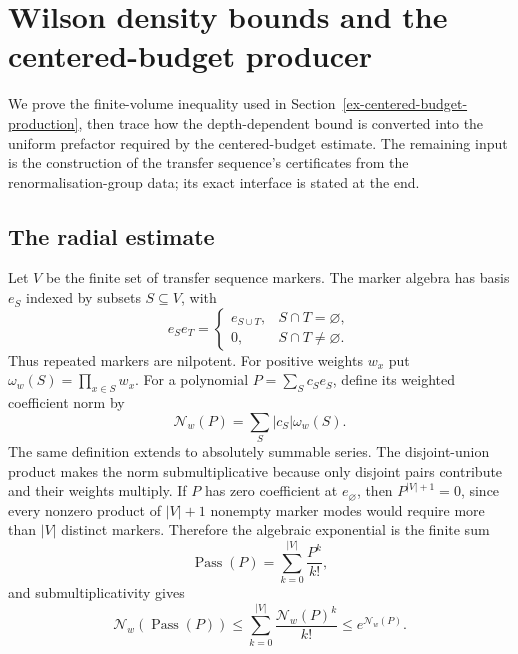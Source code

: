 \section{Wilson density bounds and the centered-budget producer}\label{ex-centered-production}

We prove the finite-volume inequality used in Section~\ref{ex-centered-budget-production}, then trace how the depth-dependent bound is converted into the uniform prefactor required by the centered-budget estimate. The remaining input is the construction of the transfer sequence's certificates from the renormalisation-group data; its exact interface is stated at the end.

\subsection{The radial estimate}

Let $V$ be the finite set of transfer sequence markers. The marker algebra has basis $e_S$ indexed by subsets $S\subseteq V$, with
\[
 e_S e_T=\begin{cases}e_{S\cup T},&S\cap T=\varnothing,\\0,&S\cap T\ne\varnothing.\end{cases}
\]
Thus repeated markers are nilpotent. For positive weights $w_x$ put $\omega_w(S)=\prod_{x\in S}w_x$. For a polynomial $P=\sum_S c_S e_S$, define its weighted coefficient norm by
\[
 \mathcal N_w(P)=\sum_S |c_S|\omega_w(S).
\]
The same definition extends to absolutely summable series. The disjoint-union product makes the norm submultiplicative because only disjoint pairs contribute and their weights multiply. If $P$ has zero coefficient at $e_\varnothing$, then $P^{|V|+1}=0$, since every nonzero product of $|V|+1$ nonempty marker modes would require more than $|V|$ distinct markers. Therefore the algebraic exponential is the finite sum
\[
 \operatorname{Pass}(P)=\sum_{k=0}^{|V|}\frac{P^k}{k!},
\]
and submultiplicativity gives
\[
 \mathcal N_w(\operatorname{Pass}(P))
 \leq\sum_{k=0}^{|V|}\frac{\mathcal N_w(P)^k}{k!}
 \leq e^{\mathcal N_w(P)}.
\]

